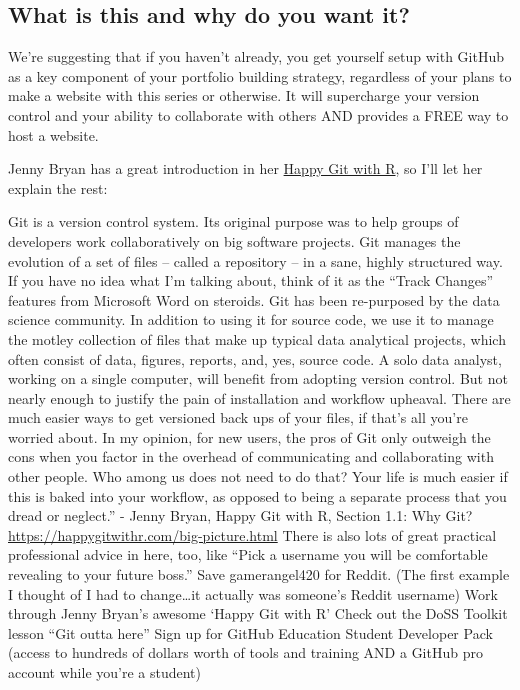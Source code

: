 \documentclass[
]{article}
\begin{document}
\hypertarget{what-is-this-and-why-do-you-want-it}{%
\subsection{What is this and why do you want it?}\label{what-is-this-and-why-do-you-want-it}}

We're suggesting that if you haven't already, you get yourself setup with GitHub as a key component of your portfolio building strategy, regardless of your plans to make a website with this series or otherwise. It will supercharge your version control and your ability to collaborate with others AND provides a FREE way to host a website.

Jenny Bryan has a great introduction in her \href{https://happygitwithr.com}{Happy Git with R}, so I'll let her explain the rest:

Git is a version control system. Its original purpose was to help groups of developers work collaboratively on big software projects. Git manages the evolution of a set of files -- called a repository -- in a sane, highly structured way. If you have no idea what I'm talking about, think of it as the ``Track Changes'' features from Microsoft Word on steroids.
Git has been re-purposed by the data science community. In addition to using it for source code, we use it to manage the motley collection of files that make up typical data analytical projects, which often consist of data, figures, reports, and, yes, source code.
A solo data analyst, working on a single computer, will benefit from adopting version control. But not nearly enough to justify the pain of installation and workflow upheaval. There are much easier ways to get versioned back ups of your files, if that's all you're worried about.
In my opinion, for new users, the pros of Git only outweigh the cons when you factor in the overhead of communicating and collaborating with other people. Who among us does not need to do that? Your life is much easier if this is baked into your workflow, as opposed to being a separate process that you dread or neglect.'' - Jenny Bryan, Happy Git with R, Section 1.1: Why Git? \url{https://happygitwithr.com/big-picture.html}
There is also lots of great practical professional advice in here, too, like ``Pick a username you will be comfortable revealing to your future boss.'' Save gamerangel420 for Reddit. (The first example I thought of I had to change\ldots it actually was someone's Reddit username)
Work through Jenny Bryan's awesome `Happy Git with R'
Check out the DoSS Toolkit lesson ``Git outta here''
Sign up for GitHub Education Student Developer Pack (access to hundreds of dollars worth of tools and training AND a GitHub pro account while you're a student)
\end{document}
